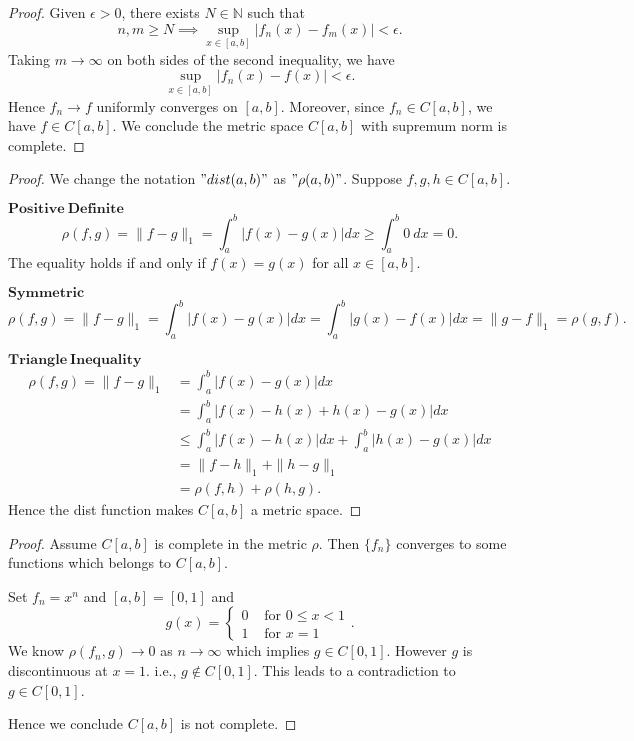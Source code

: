 \begin{Exercise}
\begin{enumerate}[a)]
\item
\begin{proof}
Given $\epsilon>0$, there exists $N\in\mathbb{N}$ such that $$
n,m\geq N \implies \sup_{x\in[a,b]}\left| f_n(x) - f_m(x) \right| < \epsilon.
$$
Taking $m\to\infty$ on both sides of the second inequality, we have
$$
\sup_{x\in[a,b]}\left| f_n(x) - f(x) \right| < \epsilon.
$$
Hence $f_n\to f$ uniformly converges on $[a,b]$.
Moreover, since $f_n\in C[a,b]$, we have $f\in C[a,b]$. We conclude the metric space $C[a,b]$ with supremum norm is complete.
\end{proof}

\item 
\begin{proof}
We change the notation $"dist(a,b)"$ as $"\rho(a,b)"$. Suppose $f,g,h \in C[a,b]$.
\item [$\mathbf{Positive\ Definite}$]
$$
\rho(f,g)
= \| f-g \|_1
= \int_{a}^{b} |f(x)-g(x)| dx
\geq \int_{a}^{b} 0\ dx
= 0.
$$
The equality holds if and only if $f(x)=g(x)$ for all $x\in[a,b]$.
\item [$\mathbf{Symmetric}$]
$$
\rho(f,g)
= \| f-g \|_1
= \int_{a}^{b} |f(x)-g(x)| dx
= \int_{a}^{b} |g(x)-f(x)| dx
= \| g-f \|_1
= \rho(g,f).
$$
\item [$\mathbf{Triangle\ Inequality}$]
\begin{align*}
\rho(f,g)
= \| f-g \|_1
&= \int_{a}^{b} |f(x)-g(x)| dx \\
&= \int_{a}^{b} |f(x)-h(x)+h(x)-g(x)| dx \\
&\leq \int_{a}^{b} |f(x)-h(x)| dx + \int_{a}^{b} |h(x)-g(x)| dx \\
&= \| f-h \|_1 + \| h-g \|_1 \\
&= \rho(f,h) + \rho(h,g).
\end{align*}
Hence the dist function makes $C[a,b]$ a metric space.
\end{proof}

\item
\begin{proof}
Assume $C[a,b]$ is complete in the metric $\rho$. Then $\{f_n\}$ converges to some functions which belongs to $C[a,b]$. 

Set $f_n = x^n$ and $[a,b] = [0,1]$ and
$$ 
g(x) = \begin{cases}0 & \mbox{ for } 0\leq x < 1 \\
1 & \mbox{ for } x = 1 \end{cases}.
$$
We know $\rho(f_n,g)\to 0$ as $n\to\infty$ which implies $g\in C[0,1]$. However $g$ is discontinuous at $x=1$. i.e., $g\notin C[0,1]$. This leads to a contradiction to $g\in C[0,1]$. 

Hence we conclude $C[a,b]$ is not complete.
\end{proof}
\end{enumerate}
\end{Exercise}